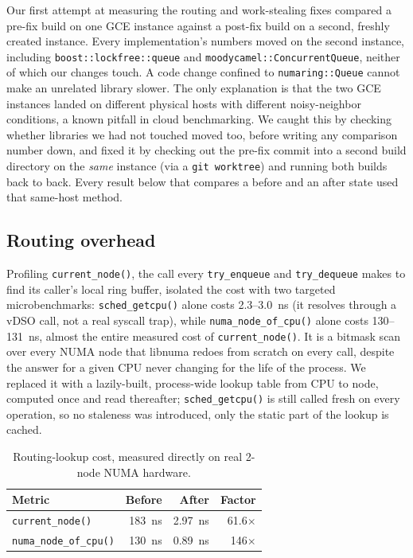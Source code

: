\documentclass[10pt,journal,compsoc]{IEEEtran}
\begin{document}
Our first attempt at measuring the routing and work-stealing fixes compared a pre-fix build on one
GCE instance against a post-fix build on a second, freshly created instance. Every implementation's
numbers moved on the second instance, including \texttt{boost::lockfree::queue} and
\texttt{moodycamel::ConcurrentQueue}, neither of which our changes touch. A code change confined to
\texttt{numaring::Queue} cannot make an unrelated library slower. The only explanation is that the
two GCE instances landed on different physical hosts with different noisy-neighbor conditions, a
known pitfall in cloud benchmarking. We caught this by checking whether libraries we had not
touched moved too, before writing any comparison number down, and fixed it by checking out the
pre-fix commit into a second build directory on the \emph{same} instance (via a \texttt{git
worktree}) and running both builds back to back. Every result below that compares a before and an
after state used that same-host method.

\subsection{Routing overhead}
\label{sec:eval-routing}

Profiling \texttt{current\_node()}, the call every \texttt{try\_enqueue} and \texttt{try\_dequeue}
makes to find its caller's local ring buffer, isolated the cost with two targeted microbenchmarks:
\texttt{sched\_getcpu()} alone costs \SI{2.3}{}--\SI{3.0}{\nano\second} (it resolves through a vDSO
call, not a real syscall trap), while \texttt{numa\_node\_of\_cpu()} alone costs
\SI{130}{}--\SI{131}{\nano\second}, almost the entire measured cost of \texttt{current\_node()}. It
is a bitmask scan over every NUMA node that libnuma redoes from scratch on every call, despite the
answer for a given CPU never changing for the life of the process. We replaced it with a
lazily-built, process-wide lookup table from CPU to node, computed once and read thereafter;
\texttt{sched\_getcpu()} is still called fresh on every operation, so no staleness was introduced,
only the static part of the lookup is cached.

\begin{table}[t]
\caption{Routing-lookup cost, measured directly on real 2-node NUMA hardware.}
\label{tab:routing}
\centering\small
\begin{tabular}{lrrr}
\toprule
Metric & Before & After & Factor \\
\midrule
\texttt{current\_node()} & \SI{183}{ns} & \SI{2.97}{ns} & 61.6$\times$ \\
\texttt{numa\_node\_of\_cpu()} & \SI{130}{ns} & \SI{0.89}{ns} & 146$\times$ \\
\bottomrule
\end{tabular}
\end{table}
\end{document}
